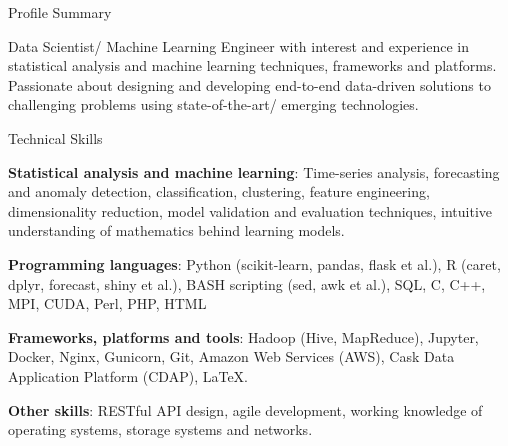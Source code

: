 \documentclass{resume} %
\begin{document}

\begin{rSection}{Profile Summary}

Data Scientist/ Machine Learning Engineer with interest and experience in statistical analysis and machine learning techniques, frameworks and platforms. Passionate about designing and developing end-to-end data-driven solutions to challenging problems using state-of-the-art/ emerging technologies. 

\end{rSection}


\begin{rSection}{Technical Skills}

\begin{rTechExpertiseList}
\item {\bf Statistical analysis and machine learning}: Time-series analysis, forecasting and anomaly detection, classification, clustering, feature engineering, dimensionality reduction, model validation and evaluation techniques, intuitive understanding of mathematics behind learning models.
\item {\bf Programming languages}: Python (scikit-learn, pandas, flask et al.), R (caret, dplyr, forecast, shiny et al.), BASH scripting (sed, awk et al.), SQL, C, C++, MPI, CUDA, Perl, PHP, HTML
\item {\bf Frameworks, platforms and tools}: Hadoop (Hive, MapReduce), Jupyter, Docker, Nginx, Gunicorn, Git, Amazon Web Services (AWS), Cask Data Application Platform (CDAP), LaTeX.
\item {\bf Other skills}: RESTful API design, agile development, working knowledge of operating systems, storage systems and networks.
\end{rTechExpertiseList}

\end{rSection}

\end{document}
